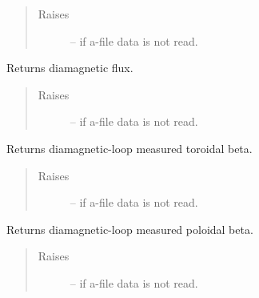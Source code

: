 \documentclass[letterpaper,10pt,english]{sphinxmanual}
\begin{document}
\begin{fulllineitems}
\begin{fulllineitems}
\begin{quote}
\begin{description}
\item[{Raises }] \leavevmode
{} -- 
if a-file data is not read.

\end{description}\end{quote}

\end{fulllineitems}


\begin{fulllineitems}
\label{eqtools:eqtools.eqdskreader.EqdskReader.getDiamagFlux}
Returns diamagnetic flux.
\begin{quote}\begin{description}
\item[{Raises }] \leavevmode
{} -- 
if a-file data is not read.

\end{description}\end{quote}

\end{fulllineitems}


\begin{fulllineitems}
\label{eqtools:eqtools.eqdskreader.EqdskReader.getDiamagBetaT}
Returns diamagnetic-loop measured toroidal beta.
\begin{quote}\begin{description}
\item[{Raises }] \leavevmode
{} -- 
if a-file data is not read.

\end{description}\end{quote}

\end{fulllineitems}


\begin{fulllineitems}
\label{eqtools:eqtools.eqdskreader.EqdskReader.getDiamagBetaP}
Returns diamagnetic-loop measured poloidal beta.
\begin{quote}\begin{description}
\item[{Raises }] \leavevmode
{} -- 
if a-file data is not read.


\end{description}
\end{quote}
\end{fulllineitems}
\end{fulllineitems}
\end{document}

